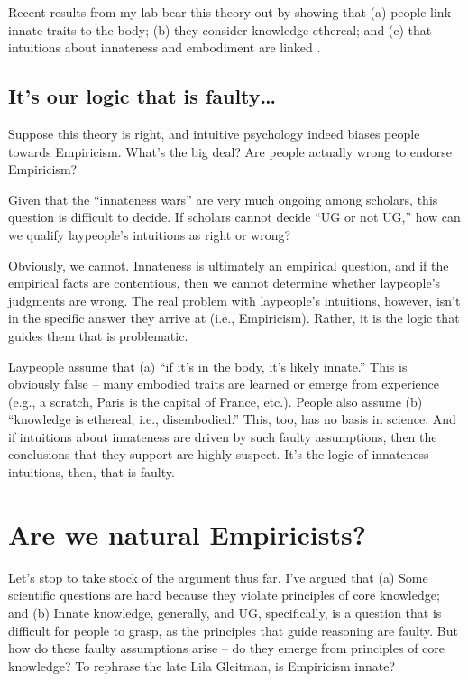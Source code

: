 \documentclass[output=paper,colorlinks,citecolor=brown
]{langscibook}
\begin{document}
Recent results from my lab bear this theory out by showing that (a) people link innate traits to the body; (b) they consider knowledge ethereal; and (c) that intuitions about innateness and embodiment are linked \citep{berent2021can,berent2020essentialist,berent2021empiricism,berent2021essentialist,berent2021public,berent2021true}.

\subsection{It’s our logic that is faulty\ldots}

Suppose this theory is right, and intuitive psychology indeed biases people towards Empiricism. What’s the big deal? Are people actually wrong to endorse Empiricism? 

Given that the “innateness wars” are very much ongoing among scholars, this question is difficult to decide. If scholars cannot decide “UG or not UG,” how can we qualify laypeople’s intuitions as right or wrong?

Obviously, we cannot. Innateness is ultimately an empirical question, and if the empirical facts are contentious, then we cannot determine whether laypeople’s judgments are wrong.  The real problem with laypeople’s intuitions, however, isn’t in the specific answer they arrive at (i.e., Empiricism). Rather, it is the logic that guides them that is problematic. 

Laypeople assume that (a) “if it’s in the body, it’s likely innate.” This is obviously false -- many embodied traits are learned or emerge from experience (e.g., a scratch, Paris is the capital of France, etc.). People also assume (b) “knowledge is ethereal, i.e., disembodied.” This, too, has no basis in science. And if intuitions about innateness are driven by such faulty assumptions, then the conclusions that they support are highly suspect. It’s the logic of innateness intuitions, then, that is faulty.

\section{Are we natural Empiricists?}\label{berent-section-4}\largerpage

Let’s stop to take stock of the argument thus far. I’ve argued that (a) Some scientific questions are hard because they violate principles of core knowledge; and (b) Innate knowledge, generally, and UG, specifically, is a question that is difficult for people to grasp, as the principles that guide reasoning are faulty. But how do these faulty assumptions arise -- do they emerge from principles of core knowledge? To rephrase the late Lila Gleitman, is Empiricism innate?
\end{document}
